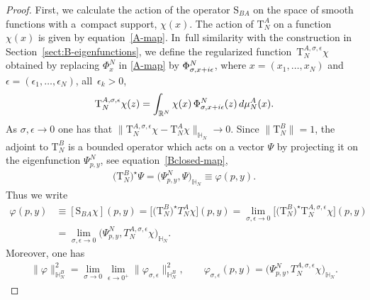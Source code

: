 \documentclass[11pt]{article}
\numberwithin{equation}{section}
\numberwithin{equation}{section}
\begin{document}
\begin{proof}
First, we calculate the action of the operator $\mathrm S_{BA}$ on the space of smooth functions with a~com\-pact support, $\chi(x)$. The
action of $\mathrm T_N^A$ on a function $\chi(x)$ is given by equation~\eqref{A-map}. In~full similarity with the construction in
Section~\ref{sect:B-eigenfunctions}, we define the regularized function~$\mathrm T_N^{A,\sigma,\epsilon}\chi$ obtained by replacing
$\Phi^N_{x}$ in \eqref{A-map} by $\Phi^N_{\sigma,x+{\rm i}\epsilon}$, where $x=(x_1,\dots,x_N)$ and $\epsilon=(\epsilon_1,\dots,\epsilon_N)$,
all~$\epsilon_k>0$,
\begin{gather}\label{A-map-reg}
\mathrm T_N^{A,\sigma,\epsilon}\chi(z)=\int_{\mathbb R^{N}} \chi( x)\, \Phi^N_{{\sigma,x+{\rm i}\epsilon}}( z)\, {\rm d}\mu_{N}^{A}( x).
\end{gather}
As $\sigma,\epsilon\to 0$ one has that $\big\|\mathrm T_N^{A,\sigma,\epsilon}\chi - \mathrm T_N^{A}\chi \big\|_{\mathbb H_N} \to 0$.
Since $\|\mathrm T_N^B\|=1$, the adjoint to $\mathrm T_N^B$ is a bounded operator which acts on a vector $\Psi$ by projecting it on the
eigenfunction $\Psi^N_{p,y}$, see equation~\eqref{Bclosed-map},
\begin{gather*}
\big(\mathrm T_N^B\big)^\star \Psi =\big(\Psi^N_{p,y},\Psi\big)_{\mathbb H_N} \equiv \varphi(p,y).
\end{gather*}
Thus we write
\begin{align*}
\varphi(p,y)&\equiv [\mathrm S_{BA}\chi](p,y)= \big[ \big(\mathrm T_N^B\big)^\star T_N^{A}\chi \big](p,y)
=\lim_{\sigma,\epsilon\to 0} \big[ \big(\mathrm T_N^B\big)^\star \mathrm T_N^{A,\sigma,\epsilon}\chi \big](p,y)
\\
& =\lim_{\sigma,\epsilon\to 0}\big( \Psi^N_{p,y} , T_N^{A,\sigma,\epsilon}\chi \big)_{\mathbb H_N}.
\end{align*}
Moreover, one has
\begin{gather}\label{varphi-def-and-norm}
\|\varphi\|^2_{\mathbb H_N^{B}}=\lim_{\sigma\to 0}\lim_{\epsilon\to0^+}\|\varphi_{\sigma,\epsilon}\|^2_{\mathbb H_N^{B}}, \qquad
\varphi_{\sigma,\epsilon}(p,y) = \big( \Psi^N_{p,y},T_N^{A,\sigma,\epsilon}\chi \big)_{\mathbb H_N}.
\end{gather}


\end{proof}
\end{document}
